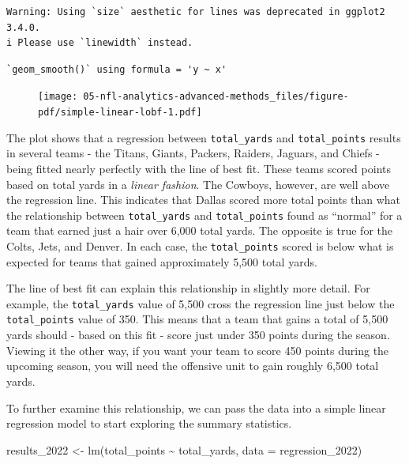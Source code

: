 \documentclass[
  letterpaper,
]{krantz}
\newenvironment{Shaded}{\begin{snugshade}}{\end{snugshade}}
\newcommand{\AttributeTok}[1]{\textcolor[rgb]{0.40,0.45,0.13}{#1}}
\newcommand{\FunctionTok}[1]{\textcolor[rgb]{0.28,0.35,0.67}{#1}}
\newcommand{\NormalTok}[1]{\textcolor[rgb]{0.00,0.23,0.31}{#1}}
\newcommand{\OtherTok}[1]{\textcolor[rgb]{0.00,0.23,0.31}{#1}}
\newcommand{\SpecialCharTok}[1]{\textcolor[rgb]{0.37,0.37,0.37}{#1}}
\begin{document}
\begin{verbatim}
Warning: Using `size` aesthetic for lines was deprecated in ggplot2 3.4.0.
i Please use `linewidth` instead.
\end{verbatim}

\begin{verbatim}
`geom_smooth()` using formula = 'y ~ x'
\end{verbatim}

\begin{figure}[H]

{\centering \texttt{[image: 05-nfl-analytics-advanced-methods\_files/figure-pdf/simple-linear-lobf-1.pdf]}

}

\end{figure}

The plot shows that a regression between \texttt{total\_yards} and
\texttt{total\_points} results in several teams - the Titans, Giants,
Packers, Raiders, Jaguars, and Chiefs - being fitted nearly perfectly
with the line of best fit. These teams scored points based on total
yards in a \emph{linear fashion}. The Cowboys, however, are well above
the regression line. This indicates that Dallas scored more total points
than what the relationship between \texttt{total\_yards} and
\texttt{total\_points} found as ``normal'' for a team that earned just a
hair over 6,000 total yards. The opposite is true for the Colts, Jets,
and Denver. In each case, the \texttt{total\_points} scored is below
what is expected for teams that gained approximately 5,500 total yards.

The line of best fit can explain this relationship in slightly more
detail. For example, the \texttt{total\_yards} value of 5,500 cross the
regression line just below the \texttt{total\_points} value of 350. This
means that a team that gains a total of 5,500 yards should - based on
this fit - score just under 350 points during the season. Viewing it the
other way, if you want your team to score 450 points during the upcoming
season, you will need the offensive unit to gain roughly 6,500 total
yards.

To further examine this relationship, we can pass the data into a simple
linear regression model to start exploring the summary statistics.

\begin{Shaded}
\begin{Highlighting}[]
\NormalTok{results\_2022 }\OtherTok{\textless{}{-}} \FunctionTok{lm}\NormalTok{(total\_points }\SpecialCharTok{\textasciitilde{}}\NormalTok{ total\_yards,}
                   \AttributeTok{data =}\NormalTok{ regression\_2022)}
\end{Highlighting}
\end{Shaded}
\end{document}
